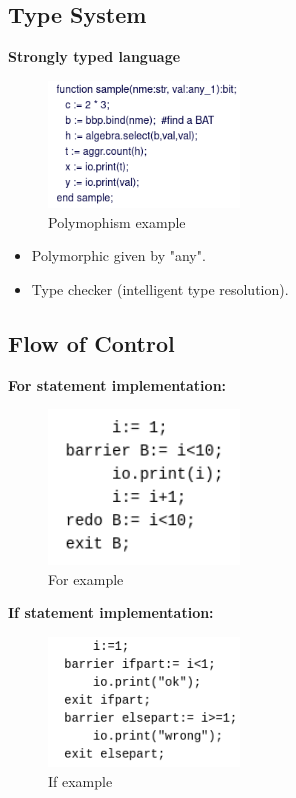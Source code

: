 \documentclass[11pt]{article}
\begin{document}
\subsection{Type System}
\label{sec:orgc4974fd}

\textbf{Strongly typed language}

\begin{figure}[htbp]
\centering
\includegraphics[width=2.0in]{./Pictures/poly-ex.png}
\caption{\label{fig:org75c537a}
Polymophism example}
\end{figure}

\begin{itemize}
\item Polymorphic given by "any".
\item Type checker (intelligent type resolution).
\end{itemize}

\subsection{Flow of Control}
\label{sec:org284973a}

\textbf{For statement implementation:}
\begin{figure}[htbp]
\centering
\includegraphics[width=2.0in]{./Pictures/for-ex.png}
\caption{\label{fig:org53c875f}
For example}
\end{figure}

\textbf{If statement implementation:}
\begin{figure}[htbp]
\centering
\includegraphics[width=2.0in]{./Pictures/if-ex.png}
\caption{\label{fig:org67e727c}
If example}
\end{figure}
\end{document}
